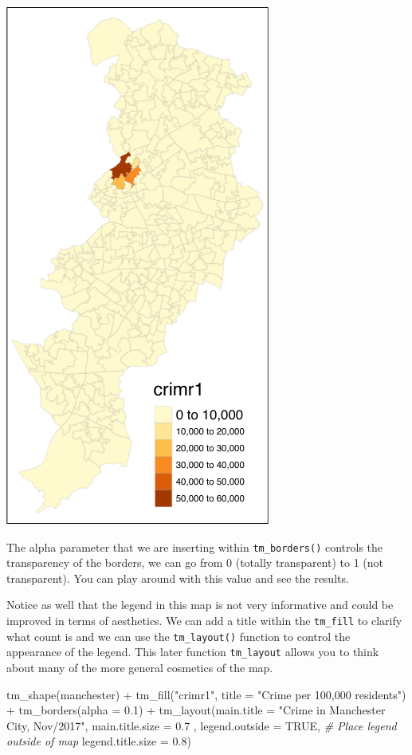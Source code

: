 \documentclass[
  krantz2]{krantz}
\makeatletter
\newenvironment{Shaded}{\begin{snugshade}}{\end{snugshade}}
\newcommand{\AttributeTok}[1]{\textcolor[rgb]{0.61,0.61,0.61}{#1}}
\newcommand{\CommentTok}[1]{\textcolor[rgb]{0.37,0.37,0.37}{\textit{#1}}}
\newcommand{\ConstantTok}[1]{\textcolor[rgb]{0,0,0}{#1}}
\newcommand{\FloatTok}[1]{\textcolor[rgb]{0.06,0.06,0.06}{#1}}
\newcommand{\FunctionTok}[1]{\textcolor[rgb]{0,0,0}{#1}}
\newcommand{\NormalTok}[1]{#1}
\newcommand{\SpecialCharTok}[1]{\textcolor[rgb]{0,0,0}{#1}}
\newcommand{\StringTok}[1]{\textcolor[rgb]{0.5,0.5,0.5}{#1}}
\newenvironment{kframe}{%
\medskip{}
\setlength{\fboxsep}{.8em}
 \def\at@end@of@kframe{}%
 \ifinner\ifhmode%
  \def\at@end@of@kframe{\end{minipage}}%
  \begin{minipage}{\columnwidth}%
 \fi\fi%
 \def\FrameCommand##1{\hskip\@totalleftmargin \hskip-\fboxsep
 \colorbox{shadecolor}{##1}\hskip-\fboxsep
     \hskip-\linewidth \hskip-\@totalleftmargin \hskip\columnwidth}%
 \MakeFramed {\advance\hsize-\width
   \@totalleftmargin\z@ \linewidth\hsize
   \@setminipage}}%
 {\par\unskip\endMakeFramed%
 \at@end@of@kframe}
\renewenvironment{Shaded}{\begin{kframe}}{\end{kframe}}
\makeatother
\begin{document}
\includegraphics{crime_mapping_files/figure-latex/unnamed-chunk-86-1.pdf}

The alpha parameter that we are inserting within \texttt{tm\_borders()} controls the transparency of the borders, we can go from 0 (totally transparent) to 1 (not transparent). You can play around with this value and see the results.

Notice as well that the legend in this map is not very informative and could be improved in terms of aesthetics. We can add a title within the \texttt{tm\_fill} to clarify what count is and we can use the \texttt{tm\_layout()} function to control the appearance of the legend. This later function \texttt{tm\_layout} allows you to think about many of the more general cosmetics of the map.

\begin{Shaded}
\begin{Highlighting}[]
\FunctionTok{tm\_shape}\NormalTok{(manchester) }\SpecialCharTok{+} 
  \FunctionTok{tm\_fill}\NormalTok{(}\StringTok{"crimr1"}\NormalTok{, }\AttributeTok{title =} \StringTok{"Crime per 100,000 residents"}\NormalTok{) }\SpecialCharTok{+}
  \FunctionTok{tm\_borders}\NormalTok{(}\AttributeTok{alpha =} \FloatTok{0.1}\NormalTok{) }\SpecialCharTok{+}
  \FunctionTok{tm\_layout}\NormalTok{(}\AttributeTok{main.title =} \StringTok{"Crime in Manchester City, Nov/2017"}\NormalTok{, }
            \AttributeTok{main.title.size =} \FloatTok{0.7}\NormalTok{ ,}
            \AttributeTok{legend.outside =} \ConstantTok{TRUE}\NormalTok{,  }\CommentTok{\# Place legend outside of map }
            \AttributeTok{legend.title.size =} \FloatTok{0.8}\NormalTok{)}
\end{Highlighting}
\end{Shaded}
\end{document}
